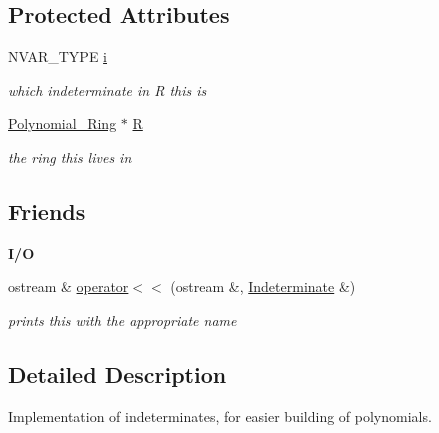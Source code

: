 \subsection*{Protected Attributes}
\begin{DoxyCompactItemize}
\item 
\mbox{\label{class_indeterminate_aab06276a83206026ef44fb6249971796}} 
N\+V\+A\+R\+\_\+\+T\+Y\+PE \hyperlink{class_indeterminate_aab06276a83206026ef44fb6249971796}{i}
\begin{DoxyCompactList}\small\item\em which indeterminate in {\ttfamily R} {\ttfamily this} is \end{DoxyCompactList}\item 
\mbox{\label{class_indeterminate_a78f5339712602f11e29a091d228032c4}} 
\hyperlink{class_polynomial___ring}{Polynomial\+\_\+\+Ring} $\ast$ \hyperlink{class_indeterminate_a78f5339712602f11e29a091d228032c4}{R}
\begin{DoxyCompactList}\small\item\em the ring {\ttfamily this} lives in \end{DoxyCompactList}\end{DoxyCompactItemize}
\subsection*{Friends}
\begin{Indent}\textbf{ I/O}\par
\begin{DoxyCompactItemize}
\item 
\mbox{\label{class_indeterminate_a0fbbf892bdfabc97b41ec7e486e83125}} 
ostream \& \hyperlink{class_indeterminate_a0fbbf892bdfabc97b41ec7e486e83125}{operator$<$$<$} (ostream \&, \hyperlink{class_indeterminate}{Indeterminate} \&)
\begin{DoxyCompactList}\small\item\em prints {\ttfamily this} with the appropriate name \end{DoxyCompactList}\end{DoxyCompactItemize}
\end{Indent}


\subsection{Detailed Description}
Implementation of indeterminates, for easier building of polynomials. 


